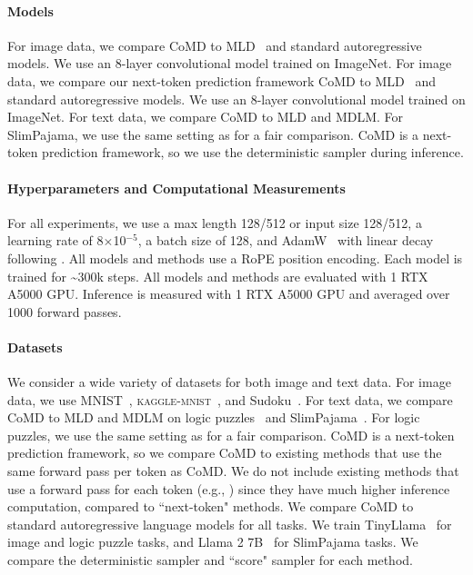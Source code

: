 \paragraph{Models} For image data, we compare CoMD to MLD~\citep{austin2023structured} and standard autoregressive models. We use an 8-layer convolutional model trained on ImageNet. For image data, we compare our next-token prediction framework CoMD to MLD~\citep{austin2023structured,austin2023structured} and standard autoregressive models. We use an 8-layer convolutional model trained on ImageNet. For text data, we compare CoMD to MLD and MDLM. For SlimPajama, we use the same setting as \citet{nie2024scaling} for a fair comparison. CoMD is a next-token prediction framework, so we use the deterministic sampler during inference. 

\paragraph{Hyperparameters and Computational Measurements}
For all experiments, we use a max length 128/512 or input size 128/512, a learning rate of 8$\times$10$^{-5}$, a batch size of 128, and AdamW~\citep{loshchilov2019decoupled} with linear decay following \citet{austin2023structured}. All models and methods use a RoPE position encoding. Each model is trained for \textasciitilde300k steps. All models and methods are evaluated with 1 RTX A5000 GPU. Inference is measured with 1 RTX A5000 GPU and averaged over 1000 forward passes. 

\paragraph{Datasets}
We consider a wide variety of datasets for both image and text data. For image data, we use MNIST~\citep{lecun1998gradient}, \textsc{kaggle-mnist}~\citep{david_g__radcliffe_2020}, and Sudoku~\citep{coja2020replica}. For text data, we compare CoMD to MLD and MDLM on logic puzzles~\citep{kitouni2024factorization} and SlimPajama~\citep{soboleva2023slimpajama}. For logic puzzles, we use the same setting as \citet{kitouni2024factorization} for a fair comparison. CoMD is a next-token prediction framework, so we compare CoMD to existing methods that use the same forward pass per token as CoMD. We do not include existing methods that use a forward pass for each token (e.g., \citet{liao-etal-2020-probabilistically}) since they have much higher inference computation, compared to ``next-token" methods. We compare CoMD to standard autoregressive language models for all tasks. We train TinyLlama~\citep{zhang2024tinyllama} for image and logic puzzle tasks, and Llama 2 7B~\citep{touvron2023llama2} for SlimPajama tasks. We compare the deterministic sampler and ``score" sampler for each method.

